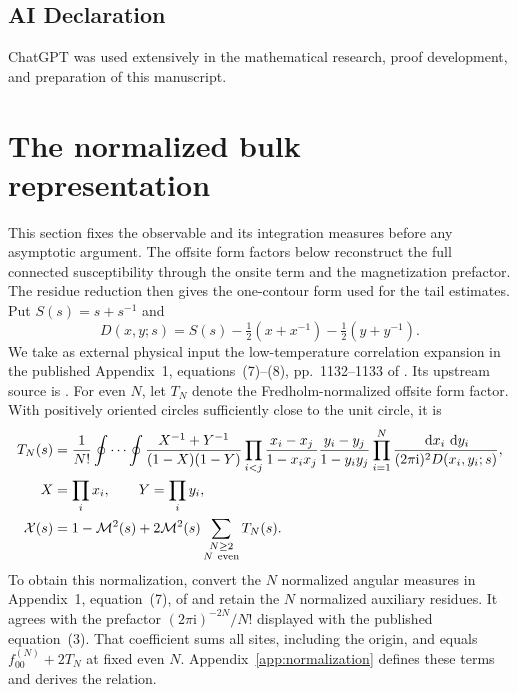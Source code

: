 \documentclass[11pt]{article}
\numberwithin{equation}{section}
\theoremstyle{definition}
\newcommand{\dd}{\,\mathrm d}
\newcommand{\ii}{\mathrm i}
\newcommand{\M}{\mathcal M}
\begin{document}
\subsection*{AI Declaration}
ChatGPT was used extensively in the mathematical research, proof development,
and preparation of this manuscript.

\tableofcontents

\section{The normalized bulk representation}\label{sec:setup}

This section fixes the observable and its integration measures before
any asymptotic argument. The offsite form factors below reconstruct the
full connected susceptibility through the onsite term and the
magnetization prefactor. The residue reduction then gives the
one-contour form used for the tail estimates.
Put \(S(s)=s+s^{-1}\) and
\[
 D(x,y;s)=S(s)-\tfrac12(x+x^{-1})-\tfrac12(y+y^{-1}).
\]
We take as external physical input the low-temperature correlation
expansion in the published Appendix~1, equations~(7)--(8),
pp.~1132--1133 of \cite{TW2014}. Its upstream source is
\cite[Cor.~2.0, p.~351; Thm.~4.1, p.~361; Thm.~5.0, p.~374,
and proof pp.~375--378]{PalmerTracy1981}.
For even \(N\), let \(T_N\) denote the Fredholm-normalized offsite
form factor. With positively oriented circles sufficiently close to the
unit circle, it is
\begin{align}
 T_N(s)&=\frac1{N!}\oint\cdots\oint
 \frac{X^{-1}+Y^{-1}}{(1-X)(1-Y)}
 \prod_{i<j}\frac{x_i-x_j}{1-x_ix_j}
              \frac{y_i-y_j}{1-y_iy_j}
 \prod_{i=1}^N\frac{\dd x_i\,\dd y_i}{(2\pi\ii)^2D(x_i,y_i;s)},\label{eq:double}\\
 X&=\prod_i x_i,\qquad Y=\prod_i y_i, \nonumber\\
 \mathcal X(s)&=1-\M^2(s)+2\M^2(s)\sum_{\substack{N\ge2\\N\ {\rm even}}}T_N(s).
 \label{eq:bulk}
\end{align}
To obtain this normalization, convert the \(N\) normalized angular
measures in Appendix~1, equation~(7), of \cite{TW2014} and retain
the \(N\) normalized auxiliary residues. It agrees with the prefactor
\((2\pi\ii)^{-2N}/N!\) displayed with the published equation~(3).
That coefficient sums all sites, including the origin, and equals
\(f_{00}^{(N)}+2T_N\) at fixed even \(N\).
Appendix~\ref{app:normalization} defines these terms and derives the relation.
\end{document}

